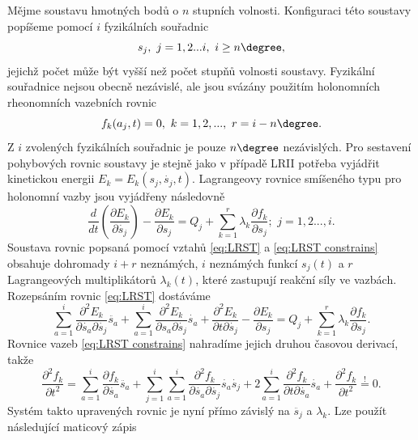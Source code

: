 Mějme soustavu hmotných bodů o $ n $ stupních volnosti. Konfiguraci této soustavy popíšeme pomocí $ i $ fyzikálních souřadnic
\begin{equation}
	s_j, \,\,j=1,2...i, \,\, i \geq n\degree,
\end{equation}
jejichž počet může být vyšší než počet stupňů volnosti soustavy. Fyzikální souřadnice nejsou obecně nezávislé, ale jsou svázány použitím holonomních rheonomních vazebních rovnic
\begin{equation}\label{eq:LRST constrains}
	f_k(a_j,t) =0, \,\, k = 1,2,..., \,\, r= i- n\degree.
\end{equation}
Z $ i $ zvolených fyzikálních souřadnic je pouze $ n\degree $ nezávislých. Pro sestavení pohybových rovnic soustavy je stejně jako v případě LRII potřeba vyjádřit kinetickou energii $ E_k = E_k(s_j,\dot{s_j},t) $. 
Lagrangeovy rovnice smíšeného typu pro holonomní vazby jsou vyjádřeny následovně
\begin{equation} \label{eq:LRST}
	\frac{d}{dt} \left( \frac{\partial E_k}{\partial \dot{s_j}}\right)  -\frac{\partial E_k}{\partial {s_j}} = Q_j + \sum_{k=1}^{r}\lambda_k \frac{\partial f_k}{\partial s_j}; \,\, j=1,2...,i.
\end{equation}
Soustava rovnic popsaná pomocí vztahů \ref{eq:LRST} a \ref{eq:LRST constrains} obsahuje dohromady $ i + r $ neznámých, $ i $ neznámých funkcí $ s_j(t) $ a $ r $ Lagrangeových multiplikátorů $ \lambda_k(t) $, které zastupují reakční síly ve vazbách.
Rozepsáním rovnic \ref{eq:LRST} dostáváme
\begin{equation} \label{eq:LRST rozepsane}
	\sum_{a=1}^{i} \frac{\partial^2E_k}{\partial \dot{s_a} \partial \dot{s_j}} \ddot{s_a} + \sum_{a=1}^{i} \frac{\partial^2E_k}{\partial {s_a} \partial \dot{s_j}} \dot{s_a} + \frac{\partial^2E_k}{\partial t \partial \dot{s_j}}-\frac{\partial E_k}{\partial s_j} = Q_j + \sum_{k=1}^{r}\lambda_k \frac{\partial f_k}{\partial s_j}.
\end{equation}
Rovnice vazeb \ref{eq:LRST constrains} nahradíme jejich druhou časovou derivací, takže
\begin{equation}\label{eq:LRST_rozepsane cond}
	\frac{\partial^2 f_k}{\partial t^2}=\sum_{a=1}^{i} \frac{\partial f_k}{\partial \dot{s_a}} \ddot{s_a}+\sum_{j=1}^{i}\sum_{a=1}^{i} \frac{\partial^2 f_k}{\partial \dot{s_a} \partial \dot{s_j}} \dot{s_a}\dot{s_j} + 2\sum_{a=1}^{i} \frac{\partial^2 f_k}{\partial t \partial \dot{s_a}} \dot{s_a} + \frac{\partial^2 f_k}{\partial t^2} \stackrel{!}{=} 0.
\end{equation}
Systém takto upravených rovnic je nyní přímo závislý na $ \ddot{s_j} $ a $ \lambda_k $. Lze použít následující maticový zápis \cite{cite:bible}
